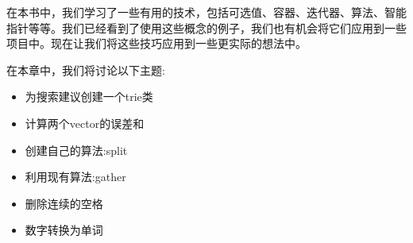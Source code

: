 在本书中，我们学习了一些有用的技术，包括可选值、容器、迭代器、算法、智能指针等等。我们已经看到了使用这些概念的例子，我们也有机会将它们应用到一些项目中。现在让我们将这些技巧应用到一些更实际的想法中。

在本章中，我们将讨论以下主题:

\begin{itemize}
\item 
为搜索建议创建一个trie类

\item 
计算两个vector的误差和

\item 
创建自己的算法:split

\item 
利用现有算法:gather

\item 
删除连续的空格

\item 
数字转换为单词
\end{itemize}